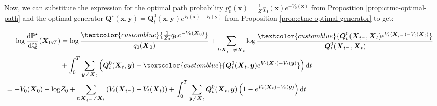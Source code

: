 \documentclass{article}
\newcommand{\bluetext}[1]{\textcolor{customblue}{#1}}
\begin{document}
Now, we can substitute the expression for the optimal path probability $p^\star_0(\boldsymbol{x})=\frac{1}{Z}q_0(\boldsymbol{x})e^{-V_0(\boldsymbol{x})}$ from Proposition \ref{prop:ctmc-optimal-path} and the optimal generator $\boldsymbol{Q}^\star(\boldsymbol{x},\boldsymbol{y})=\boldsymbol{Q}^0_t(\boldsymbol{x},\boldsymbol{y})e^{V_t(\boldsymbol{x})-V_t(\boldsymbol{y})}$ from Proposition \ref{prop:ctmc-optimal-generator} to get:
\begin{small}
\begin{align}
    \log \frac{\mathrm{d}\mathbb{P}^\star}{\mathrm{d}\mathbb{Q}}(\boldsymbol{X}_{0:T})&=\log \frac{\bluetext{\frac{1}{Z_0}q_0e^{-V_0(\boldsymbol{X}_0)}}}{q_0(\boldsymbol{X}_0)}+\sum_{t:\boldsymbol{X}_{t^-}\neq \boldsymbol{X}_t}\log \frac{\bluetext{\boldsymbol{Q}^0_t(\boldsymbol{X}_{t^-},\boldsymbol{X}_t)e^{V_t(\boldsymbol{X}_{t^-})-V_t(\boldsymbol{X}_t)}}}{\boldsymbol{Q}^0_t(\boldsymbol{X}_{t^-}, \boldsymbol{X}_t)}\nonumber\\
    &+\int_0^T\sum_{\boldsymbol{y}\neq\boldsymbol{X}_t}\left(\boldsymbol{Q}^0_t(\boldsymbol{X}_t,\boldsymbol{y})-\bluetext{\boldsymbol{Q}^0_t(\boldsymbol{X}_t,\boldsymbol{y})e^{V_t(\boldsymbol{X}_t)-V_t(\boldsymbol{y})}}\right)\mathrm{d}t\nonumber\\
    =-V_0(\boldsymbol{X}_0)-\log &Z_0+\sum_{t:\boldsymbol{X}_{t^-}\neq \boldsymbol{X}_t}\left(V_t(\boldsymbol{X}_{t^-})-V_t(\boldsymbol{X}_{t})\right)+\int_0^T\sum_{\boldsymbol{y}\neq\boldsymbol{X}_t}\boldsymbol{Q}^0_t(\boldsymbol{X}_t,\boldsymbol{y})\left(1-e^{V_t(\boldsymbol{X}_t )-V_t(\boldsymbol{y})}\right)\mathrm{d}t\label{eq:ctmc-rnd-eq2}
\end{align}
\end{small}
\end{document}
